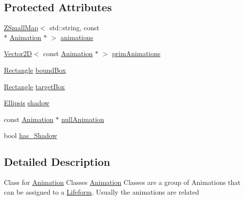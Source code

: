 \subsection*{Protected Attributes}
\begin{DoxyCompactItemize}
\item 
\hyperlink{namespaceZeta_a4c11e23ddc559dccdb5e85901d7dfb84}{Z\+Small\+Map}$<$ std\+::string, const \\*
\hyperlink{classZeta_1_1Animation}{Animation} $\ast$ $>$ \hyperlink{classZeta_1_1AnimationClass_a8b61708081d2967f65f4d3a34048dd36}{animations}
\item 
\hyperlink{classZeta_1_1Vector2D}{Vector2\+D}$<$ const \hyperlink{classZeta_1_1Animation}{Animation} $\ast$ $>$ \hyperlink{classZeta_1_1AnimationClass_a75ec3cd5a2fe104b9e8ac92858faca4c}{prim\+Animations}
\item 
\hyperlink{classZeta_1_1Rectangle}{Rectangle} \hyperlink{classZeta_1_1AnimationClass_a4e11683656c6f0648464c5b9b4e630c4}{bound\+Box}
\item 
\hyperlink{classZeta_1_1Rectangle}{Rectangle} \hyperlink{classZeta_1_1AnimationClass_a5d9cf5c7819f3f1bc9addadba989e96c}{target\+Box}
\item 
\hyperlink{classZeta_1_1Ellipsis}{Ellipsis} \hyperlink{classZeta_1_1AnimationClass_a5a1c48380989f66dfc1d90caa615ff55}{shadow}
\item 
const \hyperlink{classZeta_1_1Animation}{Animation} $\ast$ \hyperlink{classZeta_1_1AnimationClass_aa74a96c176531b81900c8568f77f966c}{null\+Animation}
\item 
bool \hyperlink{classZeta_1_1AnimationClass_a24192e217829955ac2f97a940be58922}{has\+\_\+\+Shadow}
\end{DoxyCompactItemize}


\subsection{Detailed Description}
Class for \hyperlink{classZeta_1_1Animation}{Animation} Classes \hyperlink{classZeta_1_1Animation}{Animation} Classes are a group of Animations that can be assigned to a \hyperlink{classZeta_1_1Lifeform}{Lifeform}. Usually the animations are related 

